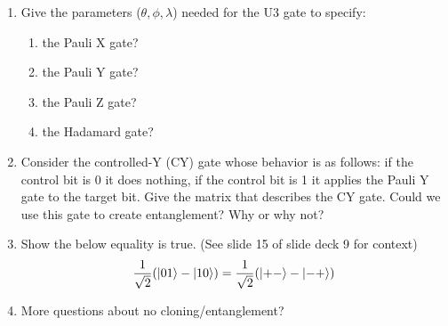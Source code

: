 \documentclass[12pt]{article}
\begin{document}
\begin{enumerate}[font=\bfseries]
    \item Give the parameters ($\theta,\phi,\lambda$) needed for the U3 gate to specify:
        \begin{enumerate}
            \item the Pauli X gate?
            \item the Pauli Y gate?
            \item the Pauli Z gate?
            \item the Hadamard gate?
        \end{enumerate}
    \item Consider the controlled-Y (CY) gate whose behavior is as follows: if the control bit is 0 it does nothing, if the control bit is 1 it applies the Pauli Y gate to the target bit. Give the matrix that describes the CY gate. Could we use this gate to create entanglement? Why or why not?
    \item Show the below equality is true. (See slide 15 of slide deck 9 for context)
    \[\frac{1}{\sqrt{2}}(\ket{01} - \ket{10}) = \frac{1}{\sqrt{2}}(\ket{+-} - \ket{-+})\]
    \item More questions about no cloning/entanglement?
\end{enumerate}
\end{document}
